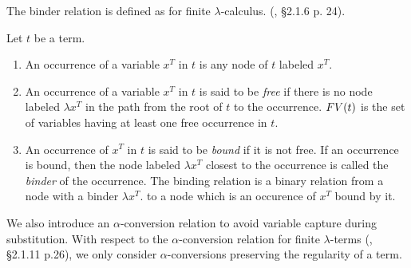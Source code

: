 The binder relation is defined as for finite $\lambda$-calculus.
(\cite{Barendregt1984}, \S 2.1.6 p. 24). 

\begin{definition}
\label{definition-binder-relation}
Let $t$ be a term.
\begin{enumerate}
\item
An occurrence of a variable $x^T$ in $t$ is any node of $t$ labeled $x^T$.
\item
An occurrence of a variable $x^T$ in $t$ is said to be \emph{free} if there is no node labeled $\lambda x^T$
in the path from the root of $t$ to the occurrence. 
${{\relax FV}}(t)$ is the set of variables having at least one free occurrence in $t$.
\item
An occurrence of $x^T$ in $t$ is said to be \emph{bound} if it is not free. If an occurrence is bound, then
the node labeled $\lambda x^T$ closest to the occurrence is called the \emph{binder} of
the occurrence.
The binding relation is a binary relation from a node with a 
binder $\lambda x^T.$  to a node  which is an occurence of $x^T$ bound by it. 
\end{enumerate}
\end{definition}

We also introduce an $\alpha$-conversion relation to avoid variable capture
during substitution. With respect to the $\alpha$-conversion
relation for finite $\lambda$-terms
(\cite{Barendregt1984}, \S 2.1.11 p.26),
we only consider $\alpha$-conversions 
preserving the regularity of a term.

